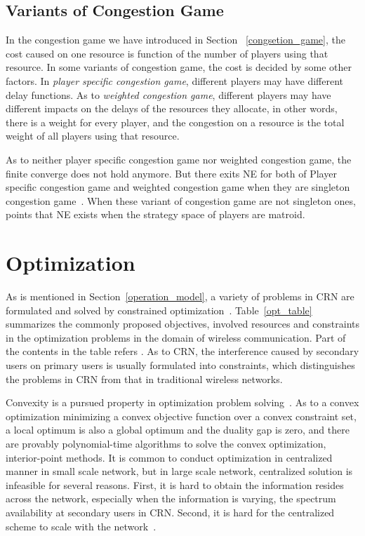 \subsection{Variants of Congestion Game}
In the congestion game we have introduced in Section ~\ref{congsetion_game}, the cost caused on one resource is function of the number of players using that resource.
In some variants of congestion game, the cost is decided by some other factors.
In \textit{player specific congestion game}, different players may have different delay functions.
As to \textit{weighted congestion game}, different players may have different impacts on the delays of the resources they allocate, in other words, there is a weight for every player, and the congestion on a resource is the total weight of all players using that resource.

As to neither player specific congestion game nor weighted congestion game, the finite converge does not hold anymore.
But there exits NE for both of Player specific congestion game and weighted congestion game when they are singleton congestion game~\cite{Milchtaich1996111, FKKMS02}.
When these variant of congestion game are not singleton ones, \cite{Ackermann06purenash} points that NE exists when the strategy space of players are matroid.








\section{Optimization}

As is mentioned in Section~\ref{operation_model}, a variety of problems in CRN are formulated and solved by constrained optimization~\cite{cacao_ca_2011, fuzzy_decision_09, resourceAllocation_imperfectSensing_2012}.
Table~\ref{opt_table} summarizes the commonly proposed objectives, involved resources and constraints in the optimization problems in the domain of wireless communication.
Part of the contents in the table refers \cite{Han:2008:RAW:1457343}.
As to CRN, the interference caused by secondary users on primary users is usually formulated into constraints, which distinguishes the problems in CRN from that in traditional wireless networks. 

Convexity is a pursued property in optimization problem solving~\cite{Boyd:2004:CO:993483}.
As to a convex optimization \ie minimizing a convex objective function over a convex constraint set, a local optimum is also a global optimum and the duality gap is zero, and there are provably polynomial-time algorithms to solve the convex optimization, \ie interior-point methods. 
It is common to conduct optimization in centralized manner in small scale network, but in large scale network, centralized solution is infeasible for several reasons.
First, it is hard to obtain the information resides across the network, especially when the information is varying, \ie the spectrum availability at secondary users in CRN.
Second, it is hard for the centralized scheme to scale with the network~\cite{Palomar06atutorial}.

